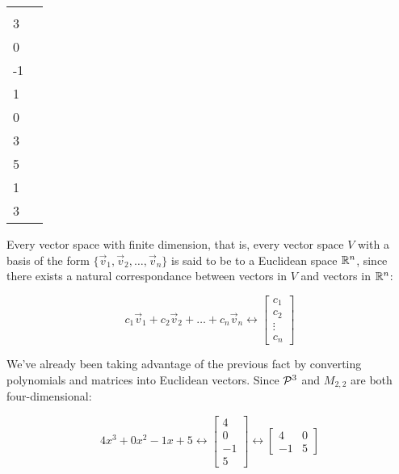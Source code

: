\begin{activity}{10}
\begin{center}
\begin{tabular}{ll}
 &
     \(\vspan\left\{
    \begin{bmatrix}5\\3\\0\\-1\end{bmatrix},
    \begin{bmatrix}-2\\1\\0\\3\end{bmatrix},
    \begin{bmatrix}4\\5\\1\\3\end{bmatrix}
    \right\}
	\)
\end{tabular}
\end{center}
\end{activity}

\begin{fact}
  Every vector space with finite dimension, that is, every
  vector space \(V\) with a basis of the form
  \(\{\vec v_1,\vec v_2,\dots,\vec v_n\}\) is said to be
   to a Euclidean space \(\IR^n\), since there exists
  a natural correspondance between vectors in \(V\) and vectors in \(\IR^n\):

  \[
    c_1\vec v_1+c_2\vec v_2+\dots+c_n\vec v_n
    \leftrightarrow
    \begin{bmatrix}
      c_1\\c_2\\\vdots\\c_n
    \end{bmatrix}
  \]
\end{fact}

\begin{observation}
  We've already been taking advantage of the previous fact by converting
  polynomials and matrices into Euclidean vectors. Since \(\P^3\)
  and \(M_{2,2}\) are both four-dimensional:

  \[
    4x^3+0x^2-1x+5
    \leftrightarrow
    \begin{bmatrix}
      4\\0\\-1\\5
    \end{bmatrix}
    \leftrightarrow
    \begin{bmatrix}
      4&0\\-1&5
    \end{bmatrix}
  \]
\end{observation}

